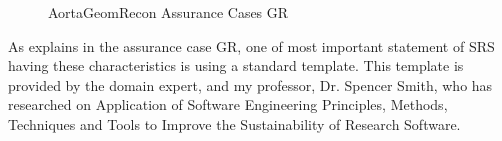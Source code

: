 \begin{figure}[H]
    \centering
    \caption[AortaGeomRecon Assurance Cases GR]{AortaGeomRecon Assurance Cases GR}
    \label{fig_agr_ac_gr}
\end{figure}



As explains in the assurance case GR, one of  most important statement of SRS having these characteristics is using a standard template. This template is provided by the domain expert, and my professor, Dr. Spencer Smith, who has researched on Application of Software Engineering Principles, Methods, Techniques and Tools to Improve the Sustainability of Research Software.

